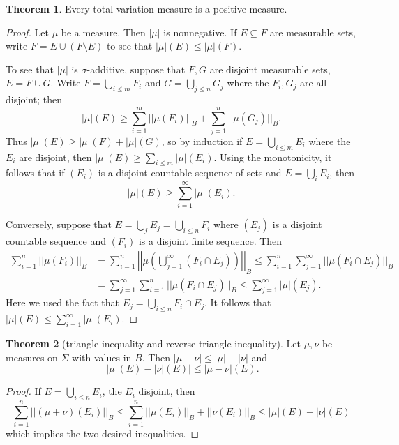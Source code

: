 \documentclass[12pt]{book}
\theoremstyle{definition}
\newtheorem{theorem}{Theorem}[section]
\begin{document}
\begin{theorem}
Every total variation measure is a positive measure.
\end{theorem}
\begin{proof}
Let $\mu$ be a measure. Then $|\mu|$ is nonnegative. If $E \subseteq F$ are measurable sets, write $F = E \cup (F \setminus E)$ to see that $|\mu|(E) \leq |\mu|(F)$.

To see that $|\mu|$ is $\sigma$-additive, suppose that $F,G$ are disjoint measurable sets, $E = F \cup G$.
Write $F = \bigcup_{i \leq m} F_i$ and $G = \bigcup_{j \leq n} G_j$ where the $F_i,G_j$ are all disjoint; then
$$|\mu|(E) \geq \sum_{i=1}^m ||\mu(F_i)||_B + \sum_{j=1}^n ||\mu(G_j)||_B.$$
Thus $|\mu|(E) \geq |\mu|(F) + |\mu|(G)$, so by induction if $E = \bigcup_{i \leq m} E_i$ where the $E_i$ are disjoint, then $|\mu|(E) \geq \sum_{i \leq m} |\mu|(E_i)$.
Using the monotonicity, it follows that if $(E_i)$ is a disjoint countable sequence of sets and $E = \bigcup_i E_i$, then
$$|\mu|(E) \geq \sum_{i=1}^\infty |\mu|(E_i).$$

Conversely, suppose that $E = \bigcup_j E_j = \bigcup_{i\leq n} F_i$ where $(E_j)$ is a disjoint countable sequence and $(F_i)$ is a disjoint finite sequence. Then
\begin{align*}
\sum_{i=1}^n ||\mu(F_i)||_B &= \sum_{i=1}^n \left|\left|\mu\left(\bigcup_{j=1}^\infty \left(F_i \cap E_j\right)\right)\right|\right|_B \leq \sum_{i=1}^n \sum_{j=1}^\infty ||\mu(F_i \cap E_j)||_B \\
&= \sum_{j=1}^\infty \sum_{i=1}^n ||\mu(F_i \cap E_j)||_B \leq \sum_{j=1}^\infty |\mu|(E_j).
\end{align*}
Here we used the fact that $E_j = \bigcup_{i \leq n} F_i \cap E_j$. It follows that $|\mu|(E) \leq \sum_{i=1}^\infty |\mu|(E_i)$.
\end{proof}

\begin{theorem}[triangle inequality and reverse triangle inequality]
\label{reverse triangle inequality}
Let $\mu,\nu$ be measures on $\Sigma$ with values in $B$. Then $|\mu + \nu| \leq |\mu| + |\nu|$ and
$$||\mu|(E) - |\nu|(E)| \leq |\mu - \nu|(E).$$
\end{theorem}
\begin{proof}
If $E = \bigcup_{i \leq n} E_i$, the $E_i$ disjoint, then
$$\sum_{i=1}^n ||(\mu + \nu)(E_i)||_B \leq \sum_{i=1}^n ||\mu(E_i)||_B + ||\nu(E_i)||_B \leq |\mu|(E) + |\nu|(E)$$
which implies the two desired inequalities.
\end{proof}
\end{document}
